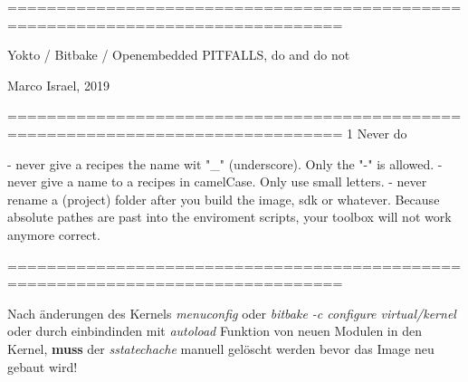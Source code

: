 ================================================================================

                    Yokto / Bitbake / Openembedded
                        PITFALLS, do and do not

                            Marco Israel, 2019



================================================================================
1 Never do

- never give a recipes the name wit "_" (underscore). Only the "-" is allowed.
- never give a name to a recipes in camelCase. Only use small letters.
- never rename a (project) folder after you build the image, sdk or whatever.
  Because absolute pathes are past into the enviroment scripts, your toolbox
  will not work anymore correct.

================================================================================


Nach änderungen des Kernels \textit{menuconfig} oder \textit{bitbake -c
    configure virtual/kernel} oder durch einbindinden mit
\textit{autoload} Funktion von neuen Modulen in den Kernel,  \textbf{muss} der \textit{sstatechache} manuell
gelöscht werden bevor das Image neu gebaut wird!


